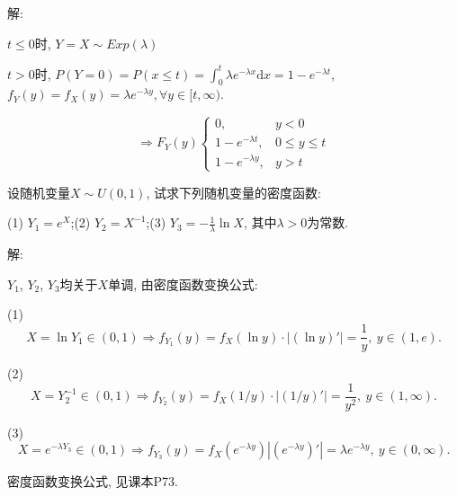 \documentclass[standard]{ExBook}
\begin{document}
\begin{qitems}
\vspace{-5em}

    \begin{bbox}
解: 

$t\leq0$时, $Y=X\sim Exp(\lambda)$

$t>0$时, $P(Y=0)=P(x\leq t)=\displaystyle\int_{0}^{t}\lambda e^{-\lambda x}\mathrm{d}x=1-e^{-\lambda t}$, $f_{Y}(y)=f_{X}(y)=\lambda e^{-\lambda y},\forall y\in[t,\infty)$.
\vspace{-2em}
\begin{center}
\begin{equation}
    \Longrightarrow
    F_{Y}(y)
    \left\{
    \begin{array}{cl}
        \nonumber
        0, &y<0\\
        1-e^{-\lambda t}, &0\leq y\leq t\\
        1-e^{-\lambda y}, &y >t
    \end{array}
    \right.
\end{equation}
\end{center}
    \end{bbox}

\vspace{-5em}

    \begin{bbox}
    \begin{shaded}
        \qitem
设随机变量$X\sim U(0,1)$, 试求下列随机变量的密度函数:

(1) $Y_{1}=e^X$;\qquad(2) $Y_{2}=X^{-1}$;\qquad(3) $Y_{3}=-\frac{1}{\lambda}\ln X$, 其中$\lambda > 0$为常数.
    \end{shaded}
    \end{bbox}

\vspace{-5em}

    \begin{bbox}
解: 

$Y_1$, $Y_2$, $Y_3$均关于$X$单调, 由密度函数变换公式:

(1) $$X=\ln Y_1\in(0,1) \Longrightarrow f_{Y_1}(y)=f_{X}(\ln y)\cdot|(\ln y)'|=\displaystyle\frac{1}{y},\ y\in(1,e).$$

(2) $$X=Y_{2}^{-1}\in(0,1) \Longrightarrow f_{Y_2}(y)=f_{X}(1/y)\cdot|(1/y)'|=\displaystyle\frac{1}{y^2},\ y\in(1,\infty).$$

(3) $$X=e^{-\lambda Y_3}\in(0,1) \Longrightarrow f_{Y_3}(y)=f_{X}(e^{-\lambda y})|(e^{-\lambda y})'|=\lambda e^{-\lambda y},\ y\in(0,\infty).$$

\textcolor{themeColor}{\selectfont {} 密度函数变换公式, 见课本P73.}
    \end{bbox}


\end{qitems}
\end{document}
